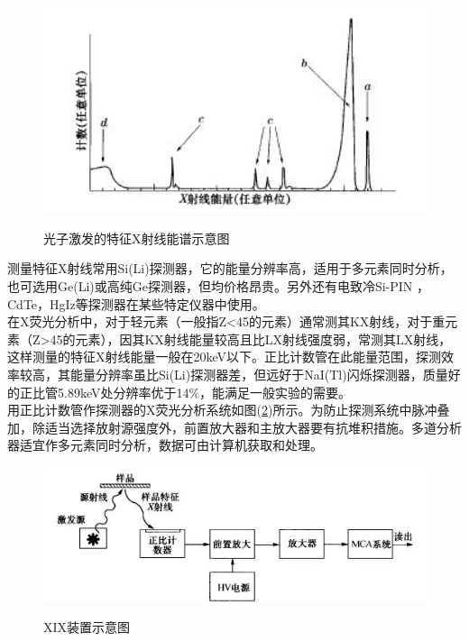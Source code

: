 \documentclass[a4paper]{article}
\begin{document}
\begin{figure}[!h]
\centering
\includegraphics[width=12cm]{fig/5.jpg}\\
\caption{光子激发的特征X射线能谱示意图}\label{5}
\end{figure}
测量特征X射线常用Si(Li)探测器，它的能量分辨率高，适用于多元素同时分析，也可选用Ge(Li)或高纯Ge探测器，但均价格昂贵。另外还有电致冷Si-PIN ，CdTe，HgIz等探测器在某些特定仪器中使用。\\
在X荧光分析中，对于轻元素（一般指Z<45的元素）通常测其KX射线，对于重元素（Z>45的元素），因其KX射线能量较高且比LX射线强度弱，常测其LX射线，这样测量的特征X射线能量一般在20keV以下。正比计数管在此能量范围，探测效率较高，其能量分辨率虽比Si(Li)探测器差，但远好于NaI(Tl)闪烁探测器，质量好的正比管5.89keV处分辨率优于14\%，能满足一般实验的需要。\\
用正比计数管作探测器的X荧光分析系统如图(\ref{XIXdevice})所示。为防止探测系统中脉冲叠加，除适当选择放射源强度外，前置放大器和主放大器要有抗堆积措施。多道分析器适宜作多元素同时分析，数据可由计算机获取和处理。
\begin{figure}[!h]
\centering
\includegraphics[width=12cm]{fig/6.jpg}\\
\caption{XIX装置示意图}\label{XIXdevice}
\end{figure}
\end{document}

